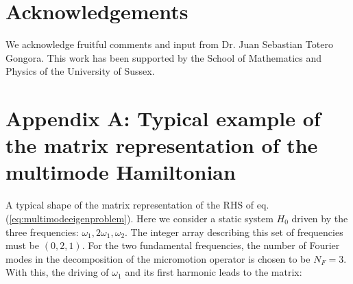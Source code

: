 \documentclass[pra,twocolumn,showkeys,preprintnumbers, amsmath,amssymb, aps,A4paper]{revtex4-1}
\begin{document}
\section*{Acknowledgements}
We acknowledge fruitful comments and input from Dr. Juan Sebastian Totero Gongora. This work has been supported by the School of Mathematics and Physics of the University of Sussex.

\section*{Appendix A: Typical example of the matrix representation of the multimode Hamiltonian}

A typical shape of the matrix representation of the RHS of eq. (\ref{eq:multimodeeigenproblem}). Here we consider a static system $H_0$ driven by the three frequencies: $\omega_1,2\omega_1,\omega_2$. The integer array describing this set of frequencies must be $(0,2,1)$. For the two fundamental frequencies, the number of Fourier modes in the decomposition of the micromotion operator is chosen to be $N_F=3$. With this, the driving of  $\omega_1$ and its first harmonic leads to the matrix:
\end{document}
